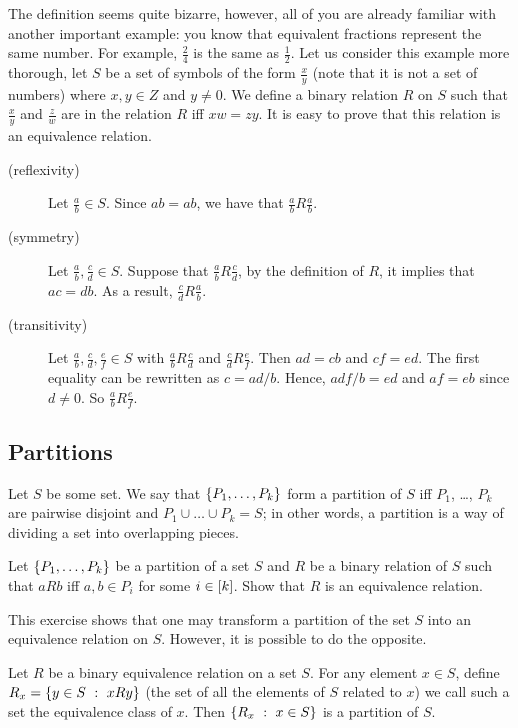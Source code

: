 The definition seems quite bizarre, however, all of you are already familiar
with another important example: you know that equivalent fractions represent the
same number. For example, $\frac{2}{4}$ is the same as $\frac{1}{2}$.
Let us consider this example more thorough, let $S$ be a set of symbols of the
form $\frac{x}{y}$ (note that it is not a set of numbers) where $x, y \in Z$
and $y \neq 0$. We define a binary relation $R$ on $S$ such that
$\frac{x}{y}$ and $\frac{z}{w}$ are in the relation $R$ iff $xw = zy$.
It is easy to prove that this relation is an equivalence relation.
\begin{description}
  \item[(reflexivity)] Let $\frac{a}{b} \in S$. Since $ab = ab$, we have that
    $\frac{a}{b} R \frac{a}{b}$.
  \item[(symmetry)] Let $\frac{a}{b}, \frac{c}{d} \in S$. Suppose that
    $\frac{a}{b} R \frac{c}{d}$, by the definition of $R$, it implies that
    $ac = db$. As a result, $\frac{c}{d} R \frac{a}{b}$.
  \item[(transitivity)] Let $\frac{a}{b}, \frac{c}{d}, \frac{e}{f} \in S$ with
    $\frac{a}{b} R \frac{c}{d}$ and $\frac{c}{d} R \frac{e}{f}$. Then
    $ad = cb$ and $cf = ed$. The first equality can be rewritten as
    $c = ad / b$.
    Hence, $adf / b = ed$ and $af = eb$ since $d \neq 0$. So $\frac{a}{b} R
    \frac{e}{f}$.
\end{description}

\subsection{Partitions}
Let $S$ be some set. We say that $\set{P_1, \dots, P_k}$ form a partition of
$S$ iff $P_1$, \dots, $P_k$ are pairwise disjoint and
$P_1 \cup \dots \cup P_k = S$; in other words, a partition is a way of dividing
a set into overlapping pieces.

\begin{exercise}
  Let $\set{P_1, \dots, P_k}$ be a partition of a set $S$ and $R$ be a binary
  relation of $S$ such that $a R b$ iff $a, b \in P_i$ for some
  $i \in [{k}]$. Show that $R$ is an equivalence relation.
\end{exercise}

This exercise shows that one may transform a partition of the set $S$ into an
equivalence relation on $S$. However, it is possible to do the opposite.
\begin{theorem}
\label{theorem:partition}
  Let $R$ be a binary equivalence relation on a set $S$. For any element
  $x \in S$, define $R_x = \set[x R y]{y \in S}$ (the set of all the elements
  of $S$ related to $x$) we call such a set the equivalence class of $x$.
  Then $\set[x \in S]{R_x}$ is a partition of $S$.
\end{theorem}

